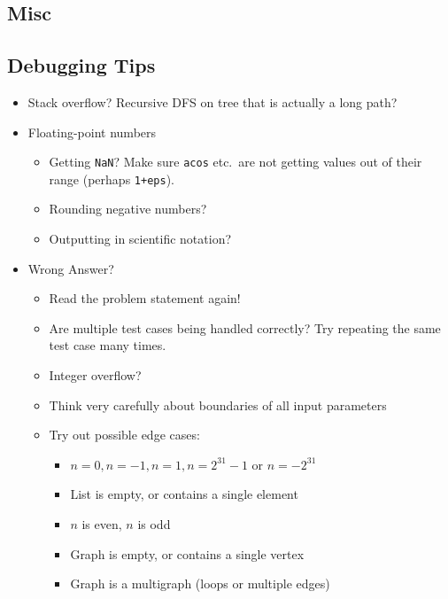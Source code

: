 \documentclass[9pt,a4paper,twocolumn,landscape,oneside]{amsart}
\newenvironment{myitemize}
{ \begin{itemize}[leftmargin=.5cm]
    \setlength{\itemsep}{0pt}
    \setlength{\parskip}{0pt}
    \setlength{\parsep}{0pt}     }
{ \end{itemize}                  }
\begin{document}
\begin{multicols*}{3}
    \section{Misc}
        \subsection{Debugging Tips}
            \begin{myitemize}
                \item Stack overflow? Recursive DFS on tree that is actually a long path?
                \item Floating-point numbers
                    \begin{itemize}
                        \item Getting \texttt{NaN}? Make sure \texttt{acos} etc.\ are
                            not getting values out of their range (perhaps
                            \texttt{1+eps}).
                        \item Rounding negative numbers?
                        \item Outputting in scientific notation?
                    \end{itemize}
                \item Wrong Answer?
                    \begin{itemize}
                        \item Read the problem statement again!
                        \item Are multiple test cases being handled correctly?
                              Try repeating the same test case many times.
                        \item Integer overflow?
                        \item Think very carefully about boundaries of all input parameters
                        \item Try out possible edge cases:
                            \begin{itemize}
                                \item $n=0, n=-1, n=1, n=2^{31}-1$ or $n=-2^{31}$
                                \item List is empty, or contains a single element
                                \item $n$ is even, $n$ is odd
                                \item Graph is empty, or contains a single vertex
                                \item Graph is a multigraph (loops or multiple edges)

\end{itemize}
\end{itemize}
\end{myitemize}
\end{multicols*}
\end{document}
